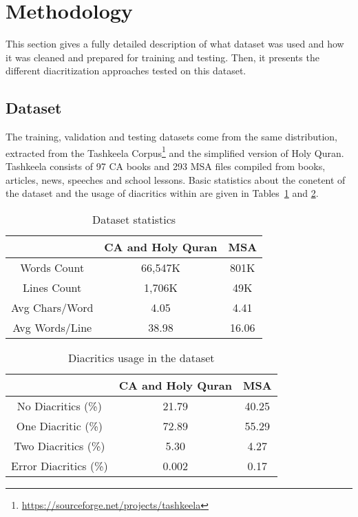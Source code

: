 \documentclass[conference]{IEEEtran}
\begin{document}
\section{Methodology}
\label{sec:method}

This section gives a fully detailed description of what dataset was used and how it was cleaned and prepared for training and testing. Then, it presents the different diacritization approaches tested on this dataset.

\subsection{Dataset}

The training, validation and testing datasets come from the same distribution, extracted from the Tashkeela Corpus\footnote{\url{https://sourceforge.net/projects/tashkeela}} and the simplified version of Holy Quran. Tashkeela consists of 97 CA books and 293 MSA files compiled from books, articles, news, speeches and school lessons.
Basic statistics about the conetent of the dataset and the usage of diacritics within are given in Tables~\ref{tab4_0} and \ref{tab4_1}.

\begin{table}
\centering
\caption{Dataset statistics}
\label{tab4_0}
\begin{tabular}{|c|c|c|}
\hline
 & CA and Holy Quran & MSA \\ \hline
Words Count & 66,547K & 801K \\ \hline
Lines Count & 1,706K & 49K \\ \hline
Avg Chars/Word & 4.05 & 4.41 \\ \hline
Avg Words/Line & 38.98 & 16.06 \\ \hline
\end{tabular}
\end{table}

\begin{table}
\centering
\caption{Diacritics usage in the dataset}
\label{tab4_1}
\begin{tabular}{|c|c|c|}
\hline
 & CA and Holy Quran & MSA \\ \hline
No Diacritics (\%) & 21.79 & 40.25 \\ \hline
One Diacritic (\%) & 72.89 & 55.29 \\ \hline
Two Diacritics (\%) & 5.30 & 4.27 \\ \hline
Error Diacritics (\%) & 0.002 & 0.17 \\ \hline
\end{tabular}
\end{table}
\end{document}
